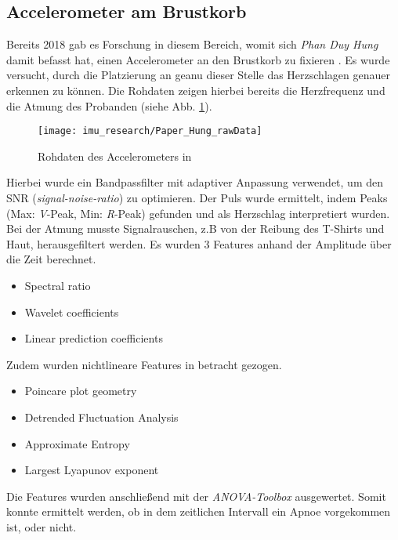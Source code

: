 \subsection{Accelerometer am Brustkorb}

Bereits 2018 gab es Forschung in diesem Bereich, womit sich \textit{Phan Duy Hung} damit befasst hat, einen Accelerometer an den Brustkorb zu fixieren \cite{hung_central_2018}.
Es wurde versucht, durch die Platzierung an geanu dieser Stelle das Herzschlagen genauer erkennen zu können. 
Die Rohdaten zeigen hierbei bereits die Herzfrequenz und die Atmung des Probanden (siehe Abb. \ref{imu_research_hung_rawData}).

\begin{figure}[ht]
    \centering
    \texttt{[image: imu\_research/Paper\_Hung\_rawData]}
    \caption{Rohdaten des Accelerometers in \cite{hung_central_2018}}
    \label{imu_research_hung_rawData}
\end{figure}

Hierbei wurde ein Bandpassfilter mit adaptiver Anpassung verwendet, um den SNR (\textit{signal-noise-ratio}) zu optimieren.
Der Puls wurde ermittelt, indem Peaks (Max: \textit{V}-Peak, Min: \textit{R}-Peak) gefunden und als Herzschlag interpretiert wurden.
Bei der Atmung musste Signalrauschen, z.B von der Reibung des T-Shirts und Haut, herausgefiltert werden. 
Es wurden 3 Features anhand der Amplitude über die Zeit berechnet. 
\begin{itemize}
    \item Spectral ratio
    \item Wavelet coefficients
    \item Linear prediction coefficients
\end{itemize}

Zudem wurden nichtlineare Features in betracht gezogen.
\begin{itemize}
    \item Poincare plot geometry
    \item Detrended Fluctuation Analysis
    \item Approximate Entropy
    \item Largest Lyapunov exponent
\end{itemize}

Die Features wurden anschließend mit der \textit{ANOVA-Toolbox} ausgewertet.
Somit konnte ermittelt werden, ob in dem zeitlichen Intervall ein Apnoe vorgekommen ist, oder nicht.

